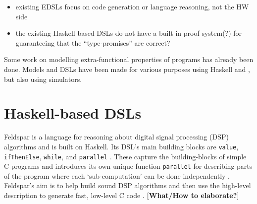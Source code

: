 \begin{itemize}
    \item existing EDSLs focus on code generation or language reasoning, not the
          HW side
    \item the existing Haskell-based DSLs do not have a built-in proof system(?)
          for guaranteeing that the ``type-promises'' are correct?
\end{itemize}

Some work on modelling extra-functional properties of programs has already been done. Models and DSLs have been made for various purposes using Haskell and \Idris, but also using simulators.

\section{Haskell-based DSLs}
	Feldspar \cite{5558637} is a language for reasoning about digital signal processing (DSP) algorithms and is built on Haskell. Its DSL's main building blocks are \texttt{value}, \texttt{ifThenElse}, \texttt{while}, and \texttt{parallel} \cite{5558637}. These capture the building-blocks of simple C programs and introduces its own unique function \texttt{parallel} for describing parts of the program where each `sub-computation' can be done independently \cite{5558637}. Feldspar's aim is to help build sound DSP algorithms and then use the high-level description to generate fast, low-level C code \cite{5558637}. \textbf{[What/How to elaborate?]}
    \\\par
	
